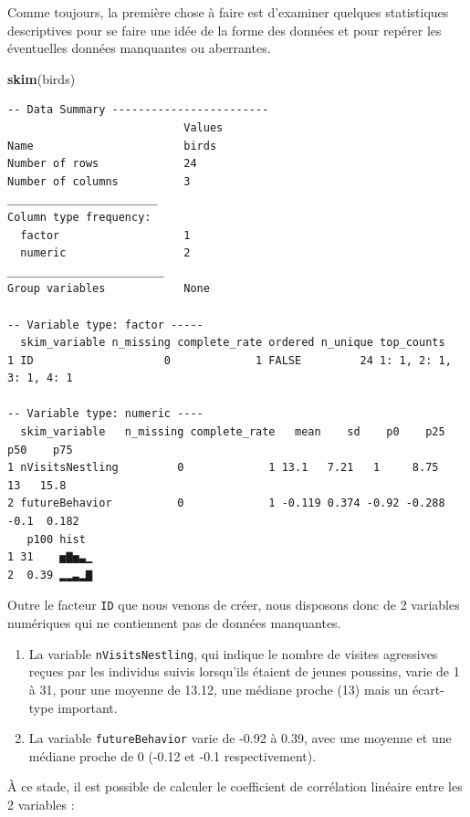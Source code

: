 \documentclass[a4paperpaper,]{article}
\newenvironment{Shaded}{\begin{snugshade}}{\end{snugshade}}
\newcommand{\KeywordTok}[1]{\textcolor[rgb]{0.12,0.11,0.11}{\textbf{#1}}}
\newcommand{\NormalTok}[1]{\textcolor[rgb]{0.12,0.11,0.11}{#1}}
\providecommand{\tightlist}{%
  \setlength{\itemsep}{0pt}\setlength{\parskip}{0pt}}
\begin{document}
Comme toujours, la première chose à faire est d'examiner quelques statistiques descriptives pour se faire une idée de la forme des données et pour repérer les éventuelles données manquantes ou aberrantes.

\begin{Shaded}
\begin{Highlighting}[]
\KeywordTok{skim}\NormalTok{(birds)}
\end{Highlighting}
\end{Shaded}

\begin{verbatim}
-- Data Summary ------------------------
                           Values
Name                       birds 
Number of rows             24    
Number of columns          3     
_______________________          
Column type frequency:           
  factor                   1     
  numeric                  2     
________________________         
Group variables            None  

-- Variable type: factor -----
  skim_variable n_missing complete_rate ordered n_unique top_counts            
1 ID                    0             1 FALSE         24 1: 1, 2: 1, 3: 1, 4: 1

-- Variable type: numeric ----
  skim_variable   n_missing complete_rate   mean    sd    p0    p25   p50    p75
1 nVisitsNestling         0             1 13.1   7.21   1     8.75   13   15.8  
2 futureBehavior          0             1 -0.119 0.374 -0.92 -0.288  -0.1  0.182
   p100 hist 
1 31    ▅▇▅▃▁
2  0.39 ▂▂▃▂▇
\end{verbatim}

Outre le facteur \texttt{ID} que nous venons de créer, nous disposons donc de 2 variables numériques qui ne contiennent pas de données manquantes.

\begin{enumerate}
\def\labelenumi{\arabic{enumi}.}
\tightlist
\item
  La variable \texttt{nVisitsNestling}, qui indique le nombre de visites agressives reçues par les individus suivis lorsqu'ils étaient de jeunes poussins, varie de 1 à 31, pour une moyenne de 13.12, une médiane proche (13) mais un écart-type important.
\item
  La variable \texttt{futureBehavior} varie de -0.92 à 0.39, avec une moyenne et une médiane proche de 0 (-0.12 et -0.1 respectivement).
\end{enumerate}

À ce stade, il est possible de calculer le coefficient de corrélation linéaire entre les 2 variables :
\end{document}
